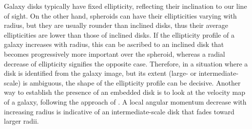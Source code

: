 \documentclass[preprint2]{emulateapj}
\begin{document}
Galaxy disks typically have fixed ellipticity, reflecting their inclination to our line of sight.
On the other hand, spheroids can have their ellipticities varying with radius,
but they are usually rounder than inclined disks, thus their average ellipticities are lower than those of inclined disks.
If the ellipticity profile of a galaxy increases with radius, 
this can be ascribed to an inclined disk that becomes progressively more important over the spheroid,
whereas a radial decrease of ellipticity signifies the opposite case.
Therefore, in a situation where a disk is identified from the galaxy image, 
but its extent (large- or intermediate-scale) is ambiguous,
the shape of the ellipticity profile can be decisive. 
Another way to establish the presence of an embedded disk is to look at the velocity map of a galaxy,
following the approach of \citet{arnold2014}. 
A local angular momentum decrease with increasing radius is indicative of an intermediate-scale disk 
that fades toward larger radii. \\
\end{document}
